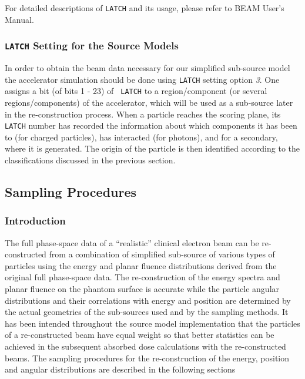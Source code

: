 \documentclass[12pt,twoside]{article}
\begin{document}
For detailed descriptions of {\tt LATCH} and its usage, please refer to
BEAM User's Manual\cite{Ro95b}.

\subsubsection{{\tt LATCH} Setting for the Source Models}

In order to obtain the beam data necessary for our simplified sub-source
model the accelerator simulation should be done using  {\tt LATCH}
setting option {\it 3}. One assigns a bit (of bits 1 - 23) of {\tt
LATCH} to a
region/component (or several regions/components) of the accelerator, which
will be used as a sub-source later in the re-construction process. When a
particle reaches the scoring plane, its {\tt LATCH} number has recorded the
information about which components it  has been to (for charged
particles), has interacted (for photons), and for a secondary, where it is
generated. The origin of the particle is then identified according to the
classifications discussed in the previous section.

\subsection{Sampling Procedures}
\subsubsection{Introduction}
The full phase-space data of a ``realistic'' clinical electron beam can be re-constructed from a combination of simplified sub-source of various types of particles using the energy and planar fluence distributions derived from the original full phase-space data. The re-construction of the energy spectra and planar fluence on the phantom surface is accurate while the particle angular distributions and their correlations with energy and position are determined by the actual geometries of the sub-sources used and by the sampling methods. It has been intended throughout the source model implementation that the particles of a re-constructed beam have equal weight so that better statistics can be achieved in the subsequent absorbed dose calculations with the re-constructed beams. The sampling procedures for the re-construction of the energy, position and angular distributions are described in the following sections
\end{document}
